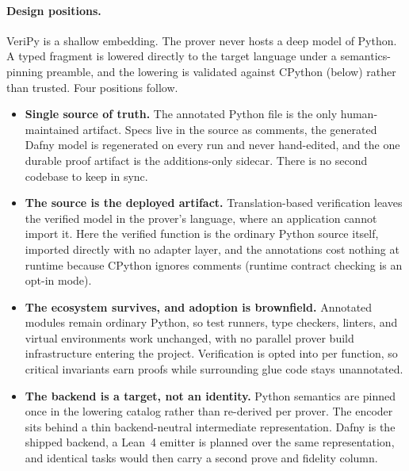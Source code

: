 \documentclass{article}
\newcommand{\toolname}{VeriPy}
\begin{document}
\paragraph{Design positions.} \toolname{} is a shallow embedding. The
prover never hosts a deep model of Python. A typed fragment is lowered
directly to the target language under a semantics-pinning preamble, and
the lowering is validated against CPython (below) rather than trusted.
Four positions follow.
\begin{itemize}
  \item \textbf{Single source of truth.} The annotated Python file is the
  only human-maintained artifact. Specs live in the source as comments,
  the generated Dafny model is regenerated on every run and never
  hand-edited, and the one durable proof artifact is the additions-only
  sidecar. There is no second codebase to keep in sync.
  \item \textbf{The source is the deployed artifact.} Translation-based
  verification leaves the verified model in the prover's language, where
  an application cannot import it. Here the verified function is the
  ordinary Python source itself, imported directly with no adapter layer,
  and the annotations cost nothing at runtime because CPython ignores
  comments (runtime contract checking is an opt-in mode).
  \item \textbf{The ecosystem survives, and adoption is brownfield.}
  Annotated modules remain ordinary Python, so test runners, type
  checkers, linters, and virtual environments work unchanged, with no
  parallel prover build infrastructure entering the project. Verification
  is opted into per function, so critical invariants earn proofs while
  surrounding glue code stays unannotated.
  \item \textbf{The backend is a target, not an identity.} Python
  semantics are pinned once in the lowering catalog rather than
  re-derived per prover. The encoder sits behind a thin backend-neutral
  intermediate representation. Dafny is the shipped backend, a Lean~4
  emitter is planned over the same representation, and identical tasks
  would then carry a second prove and fidelity column.
\end{itemize}
\end{document}
